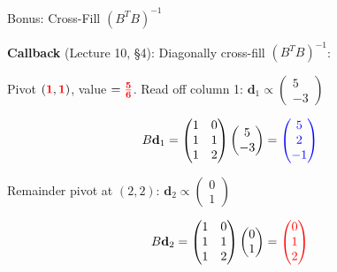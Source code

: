 \documentclass[10pt]{beamer}
\theoremstyle{definition}
\newcommand{\x}[1]{\alert{\textbf{#1}}}
\newcommand{\pvt}[1]{{\color{red}\mathbf{#1}}}       %
\newcommand{\rd}[1]{{\color{red}#1}}                  %
\newcommand{\bl}[1]{{\color{blue}#1}}                 %
\begin{document}
\begin{frame}{Bonus: Cross-Fill $(B^TB)^{-1}$}

\x{Callback} (Lecture 10, \S4): Diagonally cross-fill $(B^TB)^{-1}$:

\vspace{0.3em}

Pivot $(\pvt{1},\pvt{1})$, value $= \pvt{\frac{5}{6}}$. Read off column 1: $\mathbf{d}_1 \propto \begin{pmatrix} 5 \\ -3 \end{pmatrix}$

$$B\mathbf{d}_1 = \begin{pmatrix} 1 & 0 \\ 1 & 1 \\ 1 & 2 \end{pmatrix}\begin{pmatrix} 5 \\ -3 \end{pmatrix} = \bl{\begin{pmatrix} 5 \\ 2 \\ -1 \end{pmatrix}}$$

\vspace{0.3em}

Remainder pivot at $(2,2)$: $\mathbf{d}_2 \propto \begin{pmatrix} 0 \\ 1 \end{pmatrix}$

$$B\mathbf{d}_2 = \begin{pmatrix} 1 & 0 \\ 1 & 1 \\ 1 & 2 \end{pmatrix}\begin{pmatrix} 0 \\ 1 \end{pmatrix} = \rd{\begin{pmatrix} 0 \\ 1 \\ 2 \end{pmatrix}}$$

\end{frame}
\end{document}
